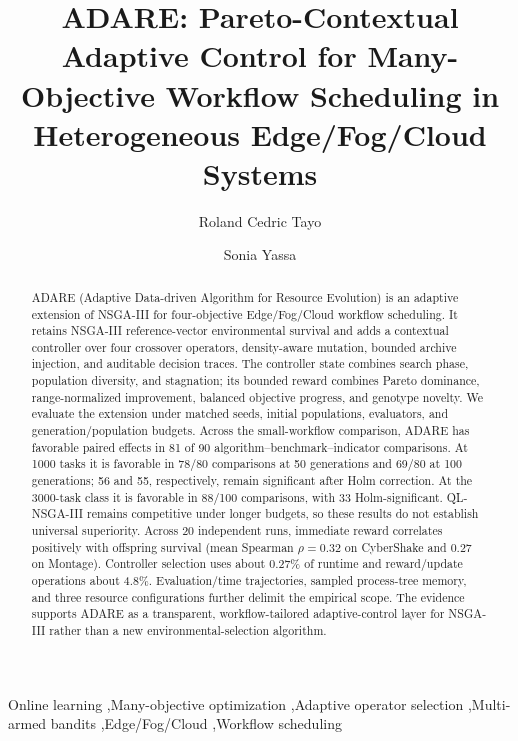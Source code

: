 \documentclass[preprint,12pt]{elsarticle}
\begin{document}
\begin{frontmatter}

\title{ADARE: Pareto-Contextual Adaptive Control for Many-Objective Workflow Scheduling in Heterogeneous Edge/Fog/Cloud Systems}

\author[cyu]{Roland Cedric Tayo}
\author[cyu]{Sonia Yassa}
\address[cyu]{CY Cergy Paris University, France}

\begin{abstract}
ADARE (Adaptive Data-driven Algorithm for Resource Evolution) is an adaptive extension of NSGA-III for four-objective Edge/Fog/Cloud workflow scheduling. It retains NSGA-III reference-vector environmental survival and adds a contextual controller over four crossover operators, density-aware mutation, bounded archive injection, and auditable decision traces. The controller state combines search phase, population diversity, and stagnation; its bounded reward combines Pareto dominance, range-normalized improvement, balanced objective progress, and genotype novelty. We evaluate the extension under matched seeds, initial populations, evaluators, and generation/population budgets. Across the small-workflow comparison, ADARE has favorable paired effects in 81 of 90 algorithm--benchmark--indicator comparisons. At 1000 tasks it is favorable in 78/80 comparisons at 50 generations and 69/80 at 100 generations; 56 and 55, respectively, remain significant after Holm correction. At the 3000-task class it is favorable in 88/100 comparisons, with 33 Holm-significant. QL-NSGA-III remains competitive under longer budgets, so these results do not establish universal superiority. Across 20 independent runs, immediate reward correlates positively with offspring survival (mean Spearman $\rho=0.32$ on CyberShake and $0.27$ on Montage). Controller selection uses about 0.27\% of runtime and reward/update operations about 4.8\%. Evaluation/time trajectories, sampled process-tree memory, and three resource configurations further delimit the empirical scope. The evidence supports ADARE as a transparent, workflow-tailored adaptive-control layer for NSGA-III rather than a new environmental-selection algorithm.
\end{abstract}

\begin{keyword}
Online learning \sep Many-objective optimization \sep Adaptive operator selection \sep Multi-armed bandits \sep Edge/Fog/Cloud \sep Workflow scheduling
\end{keyword}

\end{frontmatter}
\end{document}
